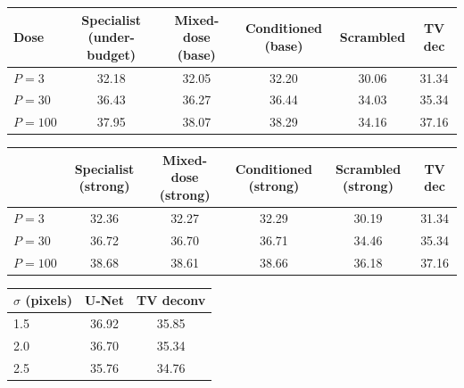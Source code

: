 \begin{tabular}{lccccc}
\toprule
Dose & Specialist (under-budget) & Mixed-dose (base) & Conditioned (base) & Scrambled & TV dec \\
\midrule
$P=3$ & 32.18 & 32.05 & 32.20 & 30.06 & 31.34 \\
$P=30$ & 36.43 & 36.27 & 36.44 & 34.03 & 35.34 \\
$P=100$ & 37.95 & 38.07 & 38.29 & 34.16 & 37.16 \\
\bottomrule
\end{tabular}
\par\vspace{8pt}
\begin{tabular}{lccccc}
\toprule
 & Specialist (strong) & Mixed-dose (strong) & Conditioned (strong) & Scrambled (strong) & TV dec \\
\midrule
$P=3$ & 32.36 & 32.27 & 32.29 & 30.19 & 31.34 \\
$P=30$ & 36.72 & 36.70 & 36.71 & 34.46 & 35.34 \\
$P=100$ & 38.68 & 38.61 & 38.66 & 36.18 & 37.16 \\
\bottomrule
\end{tabular}
\par\vspace{8pt}
\begin{tabular}{lcc}
\toprule
$\sigma$ (pixels) & U-Net & TV deconv \\
\midrule
1.5 & 36.92 & 35.85 \\
2.0 & 36.70 & 35.34 \\
2.5 & 35.76 & 34.76 \\
\bottomrule
\end{tabular}
